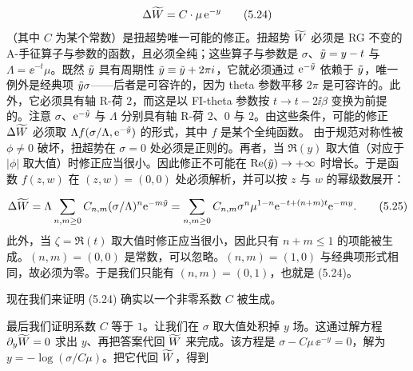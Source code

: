 \begin{equation}
    \Delta\widetilde{W}=C\cdot\mu\,\mathrm{e}^{-y}
    \tag{5.24}
\end{equation}
（其中 $C$ 为某个常数）是扭超势唯一可能的修正。扭超势 $\widetilde{W}$ 必须是 RG 不变的 A-手征算子与参数的函数，且必须全纯；这些算子与参数是 $\sigma$、$\tilde y=y-t$ 与 $\Lambda=\ee^{-t}\mu$。既然 $\tilde y$ 具有周期性 $\tilde y\equiv\tilde y+2\pi i$，它就必须通过 $\mathrm{e}^{-\tilde y}$ 依赖于 $\tilde y$，唯一例外是经典项 $\tilde y\sigma$——后者是可容许的，因为 theta 参数平移 $2\pi$ 是可容许的。此外，它必须具有轴 R-荷 $2$，而这是以 FI-theta 参数按 $t\to t-2\ii\beta$ 变换为前提的。注意 $\sigma$、$\mathrm{e}^{-\tilde y}$ 与 $\Lambda$ 分别具有轴 R-荷 $2$、$0$ 与 $2$。由这些条件，可能的修正 $\Delta\widetilde{W}$ 必须取 $\Lambda f(\sigma/\Lambda,\mathrm{e}^{-\tilde y})$ 的形式，其中 $f$ 是某个全纯函数。
由于规范对称性被 $\phi\neq0$ 破坏，扭超势在 $\sigma=0$ 处必须是正则的。再者，当 $\Re(y)$ 取大值（对应于 $|\phi|$ 取大值）时修正应当很小。因此修正不可能在 $\operatorname{Re}(\tilde y)\to+\infty$ 时增长。于是函数 $f(z,w)$ 在 $(z,w)=(0,0)$ 处必须解析，并可以按 $z$ 与 $w$ 的幂级数展开：

\begin{equation}
    \Delta\widetilde{W}=\Lambda\sum_{n,m\ge0}C_{n,m}(\sigma/\Lambda)^n\mathrm{e}^{-m\tilde y}
        =\sum_{n,m\ge0}C_{n,m}\sigma^n\mu^{1-n}\mathrm{e}^{-t+(n+m)t}\mathrm{e}^{-my}.
    \tag{5.25}
\end{equation}
此外，当 $\zeta=\Re(t)$ 取大值时修正应当很小，因此只有 $n+m\le1$ 的项能被生成。$(n,m)=(0,0)$ 是常数，可以忽略。$(n,m)=(1,0)$ 与经典项形式相同，故必须为零。于是我们只能有 $(n,m)=(0,1)$，也就是 (5.24)。



现在我们来证明 (5.24) 确实以一个非零系数 $C$ 被生成。


最后我们证明系数 $C$ 等于 $1$。让我们在 $\sigma$ 取大值处积掉 $y$ 场。这通过解方程 $\partial_y\widetilde{W}=0$ 求出 $y$、再把答案代回 $\widetilde{W}$ 来完成。该方程是 $\sigma-C\mu\,\ee^{-y}=0$，解为 $y=-\log(\sigma/C\mu)$。把它代回 $\widetilde{W}$，得到

